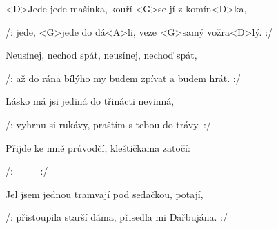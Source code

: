 

\zr
<D>Jede jede mašinka, kouří <G>se jí z komín<D>ka,

/: jede, <G>jede do dá<A>li, veze <G>samý vožra<D>lý. :/
\kr

\zs
Neusínej, nechoď spát, neusínej, nechoď spát,

/: až do rána bílýho my budem zpívat a budem hrát. :/
\ks

\zs
Lásko má jsi jediná do třinácti nevinná,

/: vyhrnu si rukávy, praštím s tebou do trávy. :/
\ks

\zr \kr

\zs
Přijde ke mně průvodčí, kleštičkama zatočí:

/:  --  --  -- 
 :/
\ks

\zr \kr

\zs
Jel jsem jednou tramvají pod sedačkou, potají,

/: přistoupila starší dáma, přisedla mi Dařbujána. :/
\ks

\zr \kr

\kp
